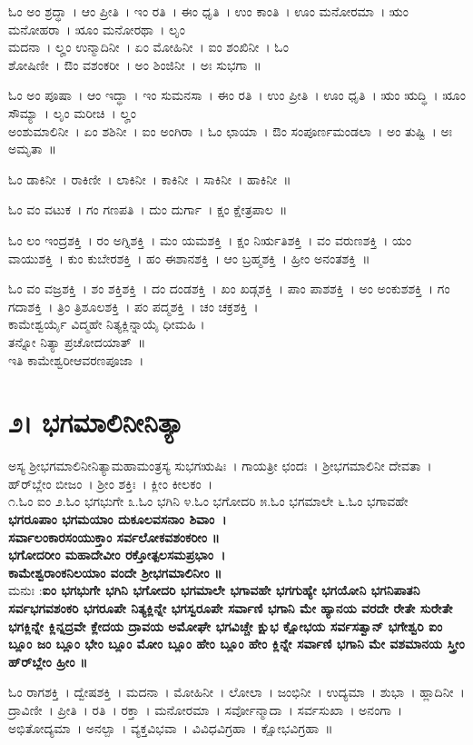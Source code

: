 ಓಂ ಅಂ ಶ್ರದ್ಧಾ~। ಆಂ ಪ್ರೀತಿ~। ಇಂ ರತಿ~। ಈಂ ಧೃತಿ~। ಉಂ ಕಾಂತಿ~। ಊಂ ಮನೋರಮಾ~। ಋಂ ಮನೋಹರಾ~। ೠಂ ಮನೋರಥಾ~। ಲೃಂ \\ಮದನಾ~। ಲೄಂ ಉನ್ಮಾದಿನೀ~। ಏಂ ಮೋಹಿನೀ~। ಐಂ ಶಂಖಿನೀ~। ಓಂ \\ ಶೋಷಿಣೀ~। ಔಂ ವಶಂಕರೀ~। ಅಂ ಶಿಂಜಿನೀ~। ಅಃ ಸುಭಗಾ~॥ 

ಓಂ ಅಂ ಪೂಷಾ~। ಆಂ ಇದ್ಧಾ~। ಇಂ ಸುಮನಸಾ~। ಈಂ ರತಿ~। ಉಂ ಪ್ರೀತಿ~। ಊಂ ಧೃತಿ~। ಋಂ ಋದ್ಧಿ~। ೠಂ ಸೌಮ್ಯಾ~। ಲೃಂ ಮರೀಚಿ~। ಲೄಂ\\ ಅಂಶುಮಾಲಿನೀ~। ಏಂ ಶಶಿನೀ~। ಐಂ ಅಂಗಿರಾ~। ಓಂ ಛಾಯಾ~। ಔಂ ಸಂಪೂರ್ಣಮಂಡಲಾ~। ಅಂ ತುಷ್ಟಿ~। ಅಃ ಅಮೃತಾ~॥ 

ಓಂ ಡಾಕಿನೀ~। ರಾಕಿಣೀ~। ಲಾಕಿನೀ~। ಕಾಕಿನೀ~। ಸಾಕಿನೀ~। ಹಾಕಿನೀ~॥ 

ಓಂ ವಂ ವಟುಕ~। ಗಂ ಗಣಪತಿ~। ದುಂ ದುರ್ಗಾ~। ಕ್ಷಂ ಕ್ಷೇತ್ರಪಾಲ~॥ 

ಓಂ ಲಂ ಇಂದ್ರಶಕ್ತಿ~। ರಂ ಅಗ್ನಿಶಕ್ತಿ~। ಮಂ ಯಮಶಕ್ತಿ~। ಕ್ಷಂ ನಿರ್ಋತಿಶಕ್ತಿ~। ವಂ ವರುಣಶಕ್ತಿ~। ಯಂ ವಾಯುಶಕ್ತಿ~। ಕುಂ ಕುಬೇರಶಕ್ತಿ~। ಹಂ ಈಶಾನಶಕ್ತಿ~। ಆಂ ಬ್ರಹ್ಮಶಕ್ತಿ~। ಹ್ರೀಂ ಅನಂತಶಕ್ತಿ~॥ 

ಓಂ ವಂ ವಜ್ರಶಕ್ತಿ~। ಶಂ ಶಕ್ತಿಶಕ್ತಿ~। ದಂ ದಂಡಶಕ್ತಿ~। ಖಂ ಖಡ್ಗಶಕ್ತಿ~। ಪಾಂ ಪಾಶಶಕ್ತಿ~। ಅಂ ಅಂಕುಶಶಕ್ತಿ~। ಗಂ ಗದಾಶಕ್ತಿ~। ತ್ರಿಂ ತ್ರಿಶೂಲಶಕ್ತಿ~। ಪಂ ಪದ್ಮಶಕ್ತಿ~। ಚಂ ಚಕ್ರಶಕ್ತಿ~।\\ ಕಾಮೇಶ್ವರ್ಯೈ ವಿದ್ಮಹೇ ನಿತ್ಯಕ್ಲಿನ್ನಾಯೈ ಧೀಮಹಿ ।\\ತನ್ನೋ ನಿತ್ಯಾ ಪ್ರಚೋದಯಾತ್~॥\\
ಇತಿ ಕಾಮೇಶ್ವರೀಆವರಣಪೂಜಾ~।
\section{೨। ಭಗಮಾಲಿನೀನಿತ್ಯಾ}
ಅಸ್ಯ ಶ್ರೀಭಗಮಾಲಿನೀನಿತ್ಯಾಮಹಾಮಂತ್ರಸ್ಯ ಸುಭಗಋಷಿಃ~। ಗಾಯತ್ರೀ ಛಂದಃ~। ಶ್ರೀಭಗಮಾಲಿನೀ ದೇವತಾ~। ಹ್‌ರ್‌ಬ್ಲೇಂ ಬೀಜಂ~। ಶ್ರೀಂ ಶಕ್ತಿಃ~। ಕ್ಲೀಂ ಕೀಲಕಂ~।\\
೧.ಓಂ ಐಂ ೨.ಓಂ ಭಗಭುಗೇ ೩.ಓಂ ಭಗಿನಿ ೪.ಓಂ ಭಗೋದರಿ ೫.ಓಂ ಭಗಮಾಲೇ ೬.ಓಂ ಭಗಾವಹೇ\\
{\bfseries ಭಗರೂಪಾಂ ಭಗಮಯಾಂ ದುಕೂಲವಸನಾಂ ಶಿವಾಂ~।\\
ಸರ್ವಾಲಂಕಾರಸಂಯುಕ್ತಾಂ ಸರ್ವಲೋಕವಶಂಕರೀಂ ॥\\
ಭಗೋದರೀಂ ಮಹಾದೇವೀಂ ರಕ್ತೋತ್ಪಲಸಮಪ್ರಭಾಂ~।\\
ಕಾಮೇಶ್ವರಾಂಕನಿಲಯಾಂ ವಂದೇ ಶ್ರೀಭಗಮಾಲಿನೀಂ ॥\\}
ಮನುಃ :{\bfseries ಐಂ ಭಗಭುಗೇ ಭಗಿನಿ ಭಗೋದರಿ ಭಗಮಾಲೇ ಭಗಾವಹೇ ಭಗಗುಹ್ಯೇ ಭಗಯೋನಿ ಭಗನಿಪಾತನಿ ಸರ್ವಭಗವಶಂಕರಿ ಭಗರೂಪೇ ನಿತ್ಯಕ್ಲಿನ್ನೇ ಭಗಸ್ವರೂಪೇ ಸರ್ವಾಣಿ ಭಗಾನಿ ಮೇ ಹ್ಯಾನಯ ವರದೇ ರೇತೇ ಸುರೇತೇ ಭಗಕ್ಲಿನ್ನೇ ಕ್ಲಿನ್ನದ್ರವೇ ಕ್ಲೇದಯ ದ್ರಾವಯ ಅಮೋಘೇ ಭಗವಿಚ್ಚೇ ಕ್ಷುಭ ಕ್ಷೋಭಯ ಸರ್ವಸತ್ವಾನ್ ಭಗೇಶ್ವರಿ ಐಂ ಬ್ಲೂಂ ಜಂ ಬ್ಲೂಂ ಭೇಂ ಬ್ಲೂಂ ಮೋಂ ಬ್ಲೂಂ ಹೇಂ ಬ್ಲೂಂ ಹೇಂ ಕ್ಲಿನ್ನೇ ಸರ್ವಾಣಿ ಭಗಾನಿ ಮೇ ವಶಮಾನಯ ಸ್ತ್ರೀಂ ಹ್‌ರ್‌ಬ್ಲೇಂ ಹ್ರೀಂ ॥}

ಓಂ ರಾಗಶಕ್ತಿ~। ದ್ವೇಷಶಕ್ತಿ~। ಮದನಾ~। ಮೋಹಿನೀ~। ಲೋಲಾ~। ಜಂಭಿನೀ~। ಉದ್ಯಮಾ~। ಶುಭಾ~। ಹ್ಲಾದಿನೀ~। ದ್ರಾವಿಣೀ~। ಪ್ರೀತಿ~। ರತಿ~। ರಕ್ತಾ~। ಮನೋರಮಾ~। ಸರ್ವೋನ್ಮಾದಾ~। ಸರ್ವಸುಖಾ~। ಅನಂಗಾ~। ಅಭಿತೋದ್ಯಮಾ~। ಅನಲ್ಪಾ~। ವ್ಯಕ್ತವಿಭವಾ~। ವಿವಿಧವಿಗ್ರಹಾ~। ಕ್ಷೋಭವಿಗ್ರಹಾ~॥ 

